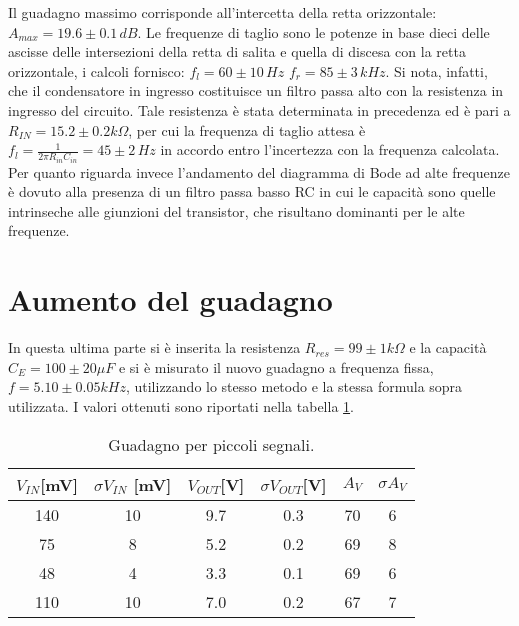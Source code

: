 \documentclass[10pt,a4paper]{article}
\begin{document}
Il guadagno massimo corrisponde all'intercetta della retta orizzontale: $A_{max}=19.6  \pm 0.1\, dB$. Le frequenze di taglio sono le potenze in base dieci delle ascisse delle intersezioni della retta di salita e quella di discesa con la retta orizzontale, i calcoli fornisco: $f_l=60\pm10 \, Hz$ $f_r=85 \pm 3\, kHz$. Si nota, infatti, che il condensatore in ingresso costituisce un filtro passa alto con la resistenza in ingresso del circuito. Tale resistenza è stata determinata in precedenza ed è pari a $R_{IN} = 15.2 \pm 0.2 k \Omega$, per cui la frequenza di taglio attesa è $f_l = \frac{1}{2 \pi R_{in}C_{in}}=45 \pm 2\, Hz$ in  accordo entro l'incertezza con la frequenza calcolata. Per quanto riguarda  invece l'andamento del diagramma di Bode ad alte frequenze è dovuto alla presenza di un filtro passa basso RC in cui le capacità sono quelle intrinseche alle giunzioni del transistor, che risultano dominanti per le alte frequenze.


\section{Aumento del guadagno}
In questa ultima parte si è inserita la resistenza $R_{res}= 99\pm 1k\Omega$ e la capacità $C_E= 100\pm20  \mu F$ e si è misurato il nuovo guadagno a frequenza fissa, $f=5.10 \pm0.05 kHz$, utilizzando lo stesso metodo e la stessa formula sopra utilizzata. I valori ottenuti sono riportati nella tabella \ref{guadpic}.

\begin{table}[h]
\centering
\begin{tabular}{|c|c|c|c|c|c|}
\hline 
$V_{IN}$[mV] & $\sigma V_{IN}$ [mV] & $V_{OUT}$[V] & $\sigma V_{OUT}$[V] & $A_V$ & $\sigma A_V$ \\ 
\hline
140 & 10 & 9.7 & 0.3 & 70 & 6\\
75 & 8 & 5.2 & 0.2 & 69 & 8\\
48 & 4 & 3.3 & 0.1 & 69 & 6\\
110 & 10 & 7.0 & 0.2 & 67 & 7\\
\hline
\end{tabular}
\caption{Guadagno per piccoli segnali.}
\label{guadpic}
\end{table}
\end{document}
